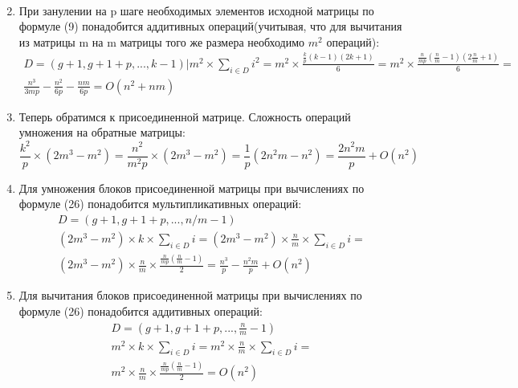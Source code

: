 \documentclass[12pt, a4paper]{article}
\begin{document}
\begin{enumerate}
\begin{equation}
\begin{aligned}
\end{aligned}
\end{equation}
\item При занулении на p шаге необходимых элементов исходной матрицы по формуле (9) понадобится аддитивных операций(учитывая, что для вычитания из матрицы m на m матрицы того же размера необходимо $m^2$ операций):
\begin{equation}
\begin{aligned}
D=(g+1,g+1+p, ...,k-1) |m^2 \times \sum_{i \in D}i^2 = m^2 \times \frac{\frac{k}{p}(k-1)(2k+1)}{6} = m^2 \times \frac{\frac{n}{mp}(\frac{n}{m}-1)(2\frac{n}{m}+1)}{6} = \\ \frac{n^3}{3mp} - \frac{n^2}{6p} - \frac{nm}{6p} = O(n^2 + nm)
\end{aligned}
\end{equation}
\item Теперь обратимся к присоединенной матрице. Сложность операций умножения на обратные матрицы:
\begin{equation}
\frac{k^2}{p} \times (2m^3 - m^2) = \frac{n^2}{m^2p} \times (2m^3 - m^2) =\frac{1}{p} (2n^2m - n^2) = \frac{2n^2m}{p} + O(n^2)
\end{equation}
\item Для умножения блоков присоединенной матрицы при вычислениях по формуле (26) понадобится мультипликативных операций:
\begin{equation}
\begin{aligned}
D=(g+1,g+1+p, ...,n/m-1)\\(2m^3 - m^2) \times k \times \sum_{i \in D}i = (2m^3 - m^2) \times \frac{n}{m} \times \sum_{i \in D}i = \\ (2m^3 - m^2) \times \frac{n}{m} \times \frac{\frac{n}{mp}(\frac{n}{m}-1)}{2} = \frac{n^3}{p} - \frac{n^2m}{p} +O(n^2)
\end{aligned}
\end{equation}
\item Для вычитания блоков присоединенной матрицы при вычислениях по формуле (26) понадобится аддитивных операций:
\begin{equation}
\begin{aligned}
D=(g+1,g+1+p, ...,\frac{n}{m}-1)\\m^2 \times k \times \sum_{i \in D}i = m^2 \times \frac{n}{m} \times \sum_{i \in D}i = \\ m^2 \times \frac{n}{m} \times \frac{\frac{n}{mp}(\frac{n}{m}-1)}{2} = O(n^2)
\end{aligned}
\end{equation}

\end{enumerate}
\end{document}
